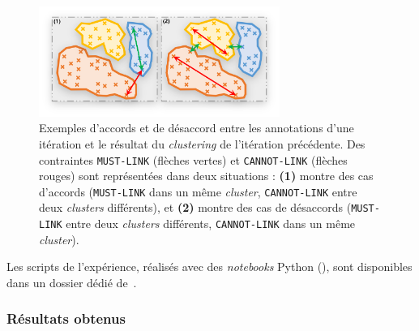 			\begin{figure}[!htb]
				\centering
				\includegraphics[width=0.7\textwidth]{figures/example-accord-annotation-clustering}
				\caption{Exemples d'accords et de désaccord entre les annotations d'une itération et le résultat du \textit{clustering} de l'itération précédente.
				Des contraintes \texttt{MUST-LINK} (flèches vertes) et \texttt{CANNOT-LINK} (flèches rouges) sont représentées dans deux situations : \textbf{(1)} montre des cas d'accords (\texttt{MUST-LINK} dans un même \textit{cluster}, \texttt{CANNOT-LINK} entre deux \textit{clusters} différents), et \textbf{(2)} montre des cas de désaccords (\texttt{MUST-LINK} entre deux \textit{clusters} différents, \texttt{CANNOT-LINK} dans un même \textit{cluster}).}
				\label{figure:4.5.1-ETUDE-RENTABILITE-ACCORD-ANNOTATION-CLUSTERING-EXEMPLE}
			\end{figure}
			
			\begin{leftBarInformation}
				Les scripts de l'expérience, réalisés avec des \textit{notebooks} Python (\cite{van-rossum-drake:2009:python-reference-manual}), sont disponibles dans un dossier dédié de~\cite{schild:2021:cognitivefactory-interactiveclusteringcomparativestudy}.
			\end{leftBarInformation}

		\subsubsection{Résultats obtenus}
			

